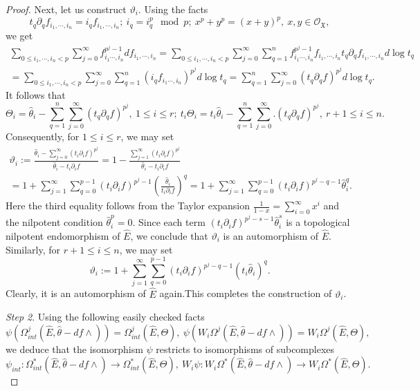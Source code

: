 \documentclass[10pt,a4paper]{amsart}
\begin{document}
\begin{proof}
Next, let us construct $\vartheta_i$. Using the facts
$$
t_q\partial_qf_{i_1,\cdots,i_n}=i_qf_{i_1,\cdots,i_n};~i_q=i_q^p\mod p;~x^p+y^p=(x+y)^p,~x,y\in\mathcal O_{\mathfrak X},
$$
we get
\begin{eqnarray*}
\sum_{0\leq i_1,\cdots,i_n<p}\sum_{j=0}^{\infty}f_{i_1\cdots,i_n}^{p^j-1}df_{i_1,\cdots,i_n}=\sum_{0\leq i_1,\cdots,i_n<p}\sum_{j=0}^{\infty}\sum_{q=1}^nf_{i_1\cdots,i_n}^{p^j-1}f_{i_1,\cdots,i_n}t_q\partial_qf_{i_1,\cdots,i_n}d\log t_q\\
=\sum_{0\leq i_1,\cdots,i_n<p}\sum_{j=0}^{\infty}\sum_{q=1}^n(i_qf_{i_1\cdots,i_n})^{p^j}d\log t_q=\sum_{q=1}^n\sum_{j=0}^{\infty}(t_q\partial_qf)^{p^j}d\log t_q.~~~~~~~~~~
\end{eqnarray*}
It follows that
$$
\Theta_i=\hat\theta_i-\sum_{q=1}^n\sum_{j=0}^{\infty}(t_q\partial_qf)^{p^j},~1\leq i\leq r;~t_i\Theta_i=t_i\hat\theta_i-\sum_{q=1}^n\sum_{j=0}^{\infty}.(t_q\partial_qf)^{p^j},~r+1\leq i\leq n.
$$
Consequently, for $1\leq i\leq r$, we may set
\begin{eqnarray*}
\vartheta_i:=\frac{\hat\theta_i-\sum_{j=0}^\infty(t_i\partial_i f)^{p^j}}{\hat\theta_i-t_i\partial_i f}=1-\frac{\sum_{j=1}^\infty(t_i\partial_i f)^{p^j}}{\hat\theta_i-t_i\partial_i f}~~~~~~\\
=1+\sum_{j=1}^\infty\sum_{q=0}^{p-1}(t_i\partial_i f)^{p^j-1}(\frac{\hat\theta_i}{t_i\partial_if})^q=1+\sum_{j=1}^\infty\sum_{q=0}^{p-1}(t_i\partial_i f)^{p^j-q-1}\hat\theta_i^q.
\end{eqnarray*}
Here the third equality follows from the Taylor expansion
$\frac{1}{1-x}=\sum_{i=0}^\infty x^i$
and the nilpotent condition $\hat\theta_i^p=0$. Since each term $(t_i\partial_i f)^{p^j-s-1}\hat\theta_i^s$ is a topological nilpotent endomorphism of $\hat E$, we conclude that $\vartheta_i$ is an automorphism of $\hat E$. Similarly, for $r+1\leq i\leq n$, we may set
$$
\vartheta_i:=1+\sum_{j=1}^\infty\sum_{q=0}^{p-1}(t_i\partial_i f)^{p^j-q-1}(t_i\hat\theta_i)^q.
$$
Clearly, it is an automorphism of $\hat E$ again.This completes the construction of $\vartheta_i$.

\emph{Step 2}. Using the following easily checked facts
$$
\psi(\Omega_{int}^j(\hat E,\hat\theta-df\wedge))=\Omega_{int}^j(\hat E,\Theta),~\psi(W_i\Omega^j(\hat E,\hat\theta-df\wedge))=W_i\Omega^j(\hat E,\Theta),
$$
we deduce that the isomorphism $\psi$ restricts to isomorphisms of subcomplexes
$$
\psi_{int}:\Omega_{int}^*(\hat E,\hat\theta-df\wedge)\to\Omega_{int}^*(\hat E,\Theta),~W_i\psi:W_i\Omega^*(\hat E,\hat\theta-df\wedge)\to W_i\Omega^*(\hat E,\Theta).
$$ 


\end{proof}
\end{document}
